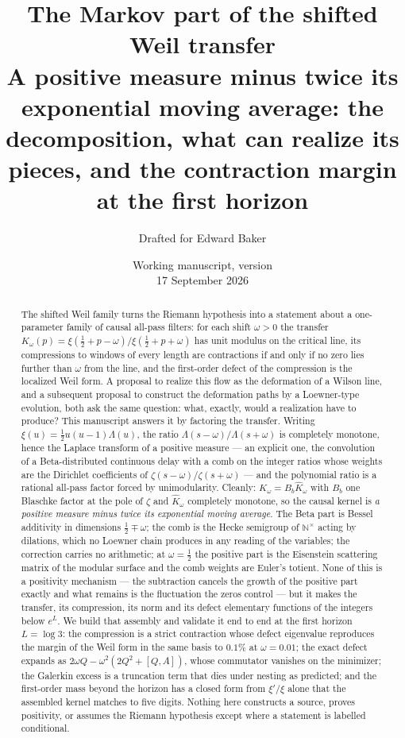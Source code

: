 \documentclass[11pt]{article}
\title{The Markov part of the shifted Weil transfer\\[5pt]
\large A positive measure minus twice its exponential moving average:
the decomposition, what can realize its pieces, and the contraction margin at
the first horizon}
\author{Drafted for Edward Baker}
\date{Working manuscript, version \draftversion\\17 September 2026}
\numberwithin{equation}{section}
\theoremstyle{definition}
\theoremstyle{remark}
\newcommand{\N}{\mathbb N}
\newcommand{\Kh}{\widehat K}
\begin{document}
\maketitle
\begin{abstract}
The shifted Weil family turns the Riemann hypothesis into a statement about a
one-parameter family of causal all-pass filters: for each shift $\omega>0$ the
transfer $K_\omega(p)=\xi(\frac12+p-\omega)/\xi(\frac12+p+\omega)$ has unit
modulus on the critical line, its compressions to windows of every length are
contractions if and only if no zero lies further than $\omega$ from the line,
and the first-order defect of the compression is the localized Weil form. A
proposal to realize this flow as the deformation of a Wilson line, and a
subsequent proposal to construct the deformation paths by a Loewner-type
evolution, both ask the same question: what, exactly, would a realization have
to produce? This manuscript answers it by factoring the transfer. Writing
$\xi(u)=\frac12u(u-1)\Lambda(u)$, the ratio $\Lambda(s-\omega)/\Lambda(s+\omega)$
is completely monotone, hence the Laplace transform of a positive measure ---
an explicit one, the convolution of a Beta-distributed continuous delay with a
comb on the integer ratios whose weights are the Dirichlet coefficients of
$\zeta(s-\omega)/\zeta(s+\omega)$ --- and the polynomial ratio is a rational
all-pass factor forced by unimodularity. Cleanly: $K_\omega=B_b\Kh_\omega$ with
$B_b$ one Blaschke factor at the pole of $\zeta$ and $\Kh_\omega$ completely
monotone, so the causal kernel is \emph{a positive measure minus twice its
exponential moving average}. The Beta part is Bessel additivity in dimensions
$\frac12\mp\omega$; the comb is the Hecke semigroup of $\N^\times$ acting by
dilations, which no Loewner chain produces in any reading of the variables; the
correction carries no arithmetic; at $\omega=\frac12$ the positive part is the
Eisenstein scattering matrix of the modular surface and the comb weights are
Euler's totient. None of this is a positivity mechanism --- the subtraction
cancels the growth of the positive part exactly and what remains is the
fluctuation the zeros control --- but it makes the transfer, its compression,
its norm and its defect elementary functions of the integers below $e^L$. We
build that assembly and validate it end to end at the first horizon $L=\log3$:
the compression is a strict contraction whose defect eigenvalue reproduces the
margin of the Weil form in the same basis to $0.1\%$ at $\omega=0.01$; the
exact defect expands as $2\omega Q-\omega^2(2Q^2+[Q,A])$, whose commutator
vanishes on the minimizer; the Galerkin excess is a truncation term that dies
under nesting as predicted; and the first-order mass beyond the horizon has a
closed form from $\xi'/\xi$ alone that the assembled kernel matches to five
digits. Nothing here constructs a source, proves positivity, or assumes the
Riemann hypothesis except where a statement is labelled conditional.
\end{abstract}
\end{document}
